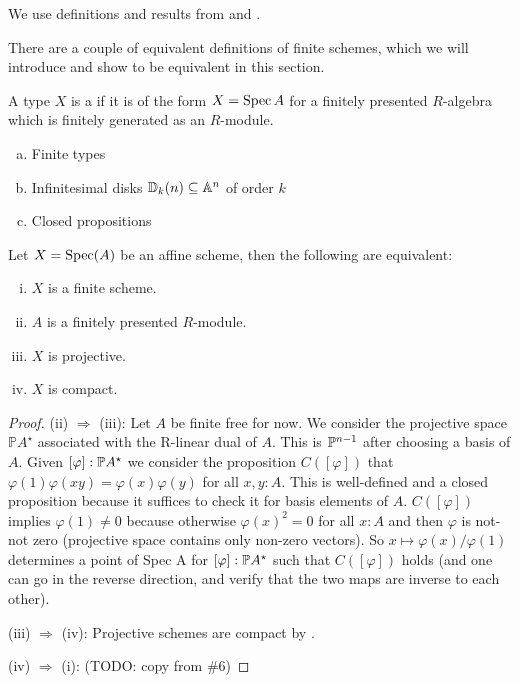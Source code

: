 We use definitions and results from \cite{draft} and \cite{proper-draft}.

There are a couple of equivalent definitions of finite schemes, which we will introduce and show to be equivalent in this section.

\begin{definition}
  A type $X$ is a  if it is of the form $X=\operatorname{Spec} A$ for a finitely presented $R$-algebra which is finitely generated as an $R$-module.
\end{definition}

\begin{example}
  \begin{enumerate}[(a)]
  \item Finite types
  \item Infinitesimal disks $\mathbb{D}_k(n)\subseteq\mathbb{A}^n$ of order $k$
  \item Closed propositions
  \end{enumerate}
\end{example}

\begin{theorem}
  \label{finite-scheme-characterization}
  Let $X=\operatorname{Spec}(A)$ be an affine scheme, then the following are equivalent:
  \begin{enumerate}[(i)]
  \item $X$ is a finite scheme.
  \item $A$ is a finitely presented $R$-module.
  \item $X$ is projective.
  \item $X$ is compact.
  \end{enumerate}
\end{theorem}

\begin{proof}
  (ii) $\Rightarrow$ (iii): 
  Let $A$ be finite free for now.
  We consider the projective space $\mathbb PA^\star$ associated with the R-linear dual of $A$.
  This is $\mathbb{P}^{n-1}$ after choosing a basis of $A$.
  Given $[\varphi] : \mathbb{P} A^\star$ we consider the proposition $C([\varphi])$ that $\varphi(1) \varphi(xy) = \varphi(x) \varphi(y)$ for all $x, y  : A$.
  This is well-defined and a closed proposition because it suffices to check it for basis elements of $A$.
  $C([\varphi])$ implies $\varphi(1) \ne 0$ because otherwise $\varphi(x)^2 = 0$ for all $x : A$ and then $\varphi$ is not-not zero (projective space contains only non-zero vectors).
  So $x \mapsto \varphi(x) / \varphi(1)$ determines a point of Spec A for $[\varphi] : \mathbb{P} A^\star$ such that $C([\varphi])$ holds (and one can go in the reverse direction, and verify that the two maps are inverse to each other).

  (iii) $\Rightarrow$ (iv): Projective schemes are compact by \cite[Theorem 3.0.7]{proper-draft}. 
  
  (iv) $\Rightarrow$ (i): (TODO: copy from \#6)
\end{proof}

